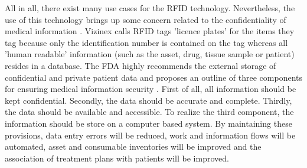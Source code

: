 All in all, there exist many use cases for the RFID technology. Nevertheless, the use of this technology brings up some concern related to the confidentiality of medical information \cite{vizinex}. Vizinex calls RFID tags 'licence plates' for the items they tag because only the identification number is contained on the tag whereas all 'human readable' information (such as the asset, drug, tissue sample or patient) resides in a database. The FDA highly recommends the external storage of confidential and private patient data and proposes an outline of three components for ensuring medical information security \cite{vizinex}. First of all, all information should be kept confidential. Secondly, the data should be accurate and complete. Thirdly, the data should be available and accessible. To realize the third component, the information should be store on a computer based system. 
By maintaining these provisions, data entry errors will be reduced, work and information flows will be automated, asset and consumable inventories will be improved and the association of treatment plans with patients will be improved.